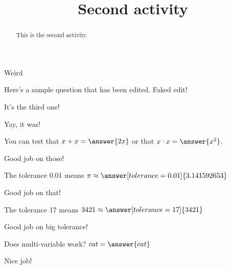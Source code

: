 \documentclass[handout]{ximera}
\title{Second activity}
\begin{document}
\begin{abstract}
This is the second activity.
\end{abstract}


\maketitle

Weird

Here's a sample question that has been edited. Faked edit!

\begin{problem}
\begin{multipleChoice}
\end{multipleChoice}
\begin{hint}It's the third one!\end{hint}
\begin{feedback}Yay, it was!\end{feedback}

\begin{problem}
   You can test that $x + x = \answer{2x}$ or that $x \cdot x = \answer{x^2}$.
\begin{feedback}Good job on those!\end{feedback}

\begin{problem}
   The tolerance 0.01 means $\pi \approx \answer[tolerance=0.01]{3.141592653}$
\begin{feedback}Good job on that!\end{feedback}

\begin{problem}
   The tolerance 17 means $3421 \approx \answer[tolerance=17]{3421}$
\begin{feedback}Good job on big tolerance!\end{feedback}

\begin{problem}
Does multi-variable work? $ cat = \answer{cat}$
\begin{feedback}Nice job!\end{feedback}
\end{problem}
\end{problem}
\end{problem}
\end{problem}
\end{problem}
\end{document}
